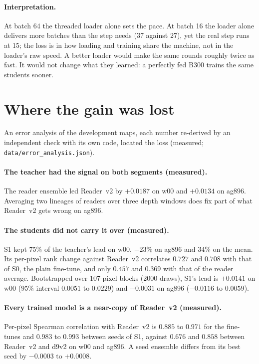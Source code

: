 \documentclass[11pt]{article}
\begin{document}
\paragraph{Interpretation.} At batch 64 the threaded loader alone sets the pace. At batch 16 the loader alone delivers more batches than the step needs (37 against 27), yet the real step runs at 15; the loss is in how loading and training share the machine, not in the loader's raw speed. A better loader would make the same rounds roughly twice as fast. It would not change what they learned: a perfectly fed B300 trains the same students sooner.

\section{Where the gain was lost}\label{sec:loss}

An error analysis of the development maps, each number re-derived by an independent check with its own code, located the loss (measured; \texttt{data/error\_analysis.json}).

\paragraph{The teacher had the signal on both segments (measured).} The reader ensemble led Reader~v2 by $+0.0187$ on w00 and $+0.0134$ on ag896. Averaging two lineages of readers over three depth windows does fix part of what Reader~v2 gets wrong on ag896.

\paragraph{The students did not carry it over (measured).} S1 kept $75\%$ of the teacher's lead on w00, $-23\%$ on ag896 and $34\%$ on the mean. Its per-pixel rank change against Reader~v2 correlates $0.727$ and $0.708$ with that of S0, the plain fine-tune, and only $0.457$ and $0.369$ with that of the reader average. Bootstrapped over 107-pixel blocks (2000 draws), S1's lead is $+0.0141$ on w00 ($95\%$ interval $0.0051$ to $0.0229$) and $-0.0031$ on ag896 ($-0.0116$ to $0.0059$).

\paragraph{Every trained model is a near-copy of Reader~v2 (measured).} Per-pixel Spearman correlation with Reader~v2 is $0.885$ to $0.971$ for the fine-tunes and $0.983$ to $0.993$ between seeds of S1, against $0.676$ and $0.858$ between Reader~v2 and d9v2 on w00 and ag896. A seed ensemble differs from its best seed by $-0.0003$ to $+0.0008$.
\end{document}
